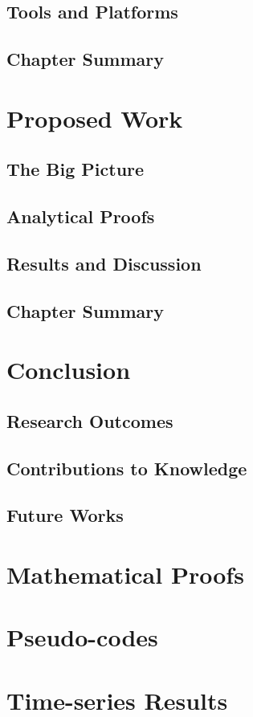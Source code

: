 \documentclass{utmthesis}
\begin{document}
\section{Tools and Platforms}
\section{Chapter Summary}


\chapter{Proposed Work}
\section{The Big Picture}
\section{Analytical Proofs}
\section{Results and Discussion}
\section{Chapter Summary}


\chapter{Conclusion}
\section{Research Outcomes}
\section{Contributions to Knowledge}
\section{Future Works}






\appendix
\chapter{Mathematical Proofs}

\chapter{Pseudo-codes}

\chapter{Time-series Results}

\endmatter
\end{document}

